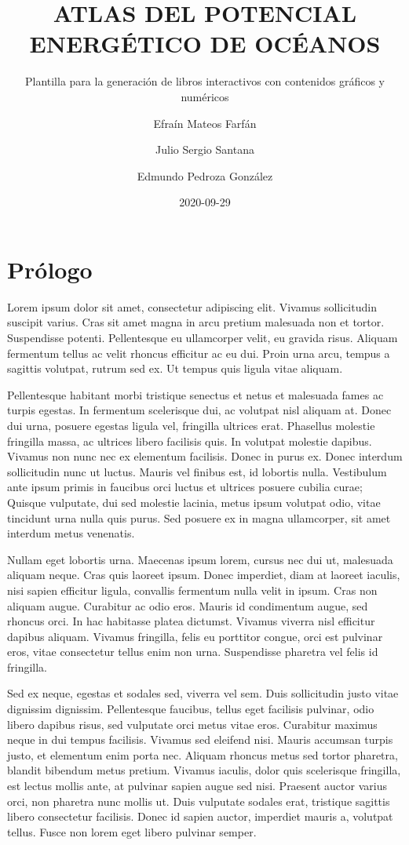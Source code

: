 \documentclass[
]{article}
\title{ATLAS DEL POTENCIAL ENERGÉTICO DE OCÉANOS}
\subtitle{Plantilla para la generación de libros interactivos con contenidos gráficos y numéricos}
\author{Efraín Mateos Farfán \and Julio Sergio Santana \and Edmundo Pedroza González}
\date{2020-09-29}
\begin{document}
\maketitle

{
\setcounter{tocdepth}{2}
\tableofcontents
}
\hypertarget{pruxf3logo}{%
\section{Prólogo}\label{pruxf3logo}}

Lorem ipsum dolor sit amet, consectetur adipiscing elit. Vivamus sollicitudin suscipit varius. Cras sit amet magna in arcu pretium malesuada non et tortor. Suspendisse potenti. Pellentesque eu ullamcorper velit, eu gravida risus. Aliquam fermentum tellus ac velit rhoncus efficitur ac eu dui. Proin urna arcu, tempus a sagittis volutpat, rutrum sed ex. Ut tempus quis ligula vitae aliquam.

Pellentesque habitant morbi tristique senectus et netus et malesuada fames ac turpis egestas. In fermentum scelerisque dui, ac volutpat nisl aliquam at. Donec dui urna, posuere egestas ligula vel, fringilla ultrices erat. Phasellus molestie fringilla massa, ac ultrices libero facilisis quis. In volutpat molestie dapibus. Vivamus non nunc nec ex elementum facilisis. Donec in purus ex. Donec interdum sollicitudin nunc ut luctus. Mauris vel finibus est, id lobortis nulla. Vestibulum ante ipsum primis in faucibus orci luctus et ultrices posuere cubilia curae; Quisque vulputate, dui sed molestie lacinia, metus ipsum volutpat odio, vitae tincidunt urna nulla quis purus. Sed posuere ex in magna ullamcorper, sit amet interdum metus venenatis.

Nullam eget lobortis urna. Maecenas ipsum lorem, cursus nec dui ut, malesuada aliquam neque. Cras quis laoreet ipsum. Donec imperdiet, diam at laoreet iaculis, nisi sapien efficitur ligula, convallis fermentum nulla velit in ipsum. Cras non aliquam augue. Curabitur ac odio eros. Mauris id condimentum augue, sed rhoncus orci. In hac habitasse platea dictumst. Vivamus viverra nisl efficitur dapibus aliquam. Vivamus fringilla, felis eu porttitor congue, orci est pulvinar eros, vitae consectetur tellus enim non urna. Suspendisse pharetra vel felis id fringilla.

Sed ex neque, egestas et sodales sed, viverra vel sem. Duis sollicitudin justo vitae dignissim dignissim. Pellentesque faucibus, tellus eget facilisis pulvinar, odio libero dapibus risus, sed vulputate orci metus vitae eros. Curabitur maximus neque in dui tempus facilisis. Vivamus sed eleifend nisi. Mauris accumsan turpis justo, et elementum enim porta nec. Aliquam rhoncus metus sed tortor pharetra, blandit bibendum metus pretium. Vivamus iaculis, dolor quis scelerisque fringilla, est lectus mollis ante, at pulvinar sapien augue sed nisi. Praesent auctor varius orci, non pharetra nunc mollis ut. Duis vulputate sodales erat, tristique sagittis libero consectetur facilisis. Donec id sapien auctor, imperdiet mauris a, volutpat tellus. Fusce non lorem eget libero pulvinar semper.
\end{document}
